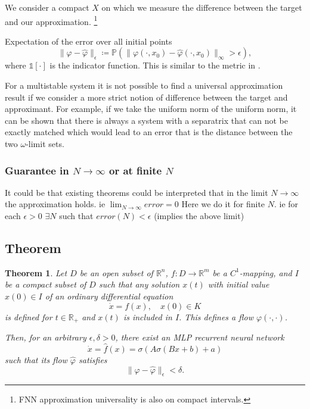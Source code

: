 \documentclass{article}
\newtheorem{theorem}{Theorem}
\theoremstyle{definition}
\theoremstyle{remark}
\newcommand{\reals}{\mathbb{R}}
\newcommand{\vol}{\operatorname{vol}}
\begin{document}
We consider a compact $X$ on which we measure the difference between the target and our approximation.
\footnote{FNN approximation universality is also on compact intervals.}

Expectation of the error over all initial points
\begin{equation}
\|\varphi-\hat \varphi\|_\epsilon \coloneqq  \mathbb{P}\left(\|\varphi(\cdot,x_0)-\hat \varphi(\cdot,x_0)\|_\infty>\epsilon\right),
\end{equation}
where $\mathds{1}[\cdot]$ is the indicator function. 
This is similar to the metric in \citep{hammer2000approximation}.


For a multistable system it is not possible to find a universal approximation result if we consider a more strict notion of difference between the target and approximant.
For example, if we take the uniform norm of the uniform norm, it can be shown that there is always a system with a separatrix that can not be exactly matched which would lead to an error that is the distance between the two $\omega$-limit sets.

\subsubsection{Guarantee in $N\rightarrow\infty$ or at finite $N$}
It could be that existing theorems could be interpreted that in the limit $N\rightarrow\infty$ the approximation holds. %
ie $\lim_{N\rightarrow\infty} error = 0$
Here we do it for finite $N$.
ie for each $\epsilon>0$ $\exists N$ such that $error(N) < \epsilon$
(implies the above limit)


\subsection{Theorem}
\begin{theorem}
Let $D$ be an open subset of $\mathbb{R}^n$, $f\colon D \to \mathbb{R}^m$ be a $C^1$-mapping, and $I$ be a compact subset of $D$ such that any solution $x(t)$ with initial value $x(0) \in I$ of an ordinary differential equation
\begin{equation}\label{eq:5}
    \dot{x} = f(x), \quad x(0) \in K
\end{equation}
is defined for $t\in\reals_{+}$ and $x(t)$ is included in $I$.
This defines a flow $\varphi(\cdot, \cdot)$.


 Then, for an arbitrary $\epsilon, \delta > 0$, there exist an MLP recurrent neural network 
 \begin{equation}
\dot x = \hat f(x) = \sigma(A\sigma(Bx+b)+a)
\end{equation}
such that its flow $\hat \varphi$ satisfies
\begin{equation}
\|\varphi-\hat \varphi\|_\epsilon < \delta.
\end{equation}
\end{theorem}
\end{document}
